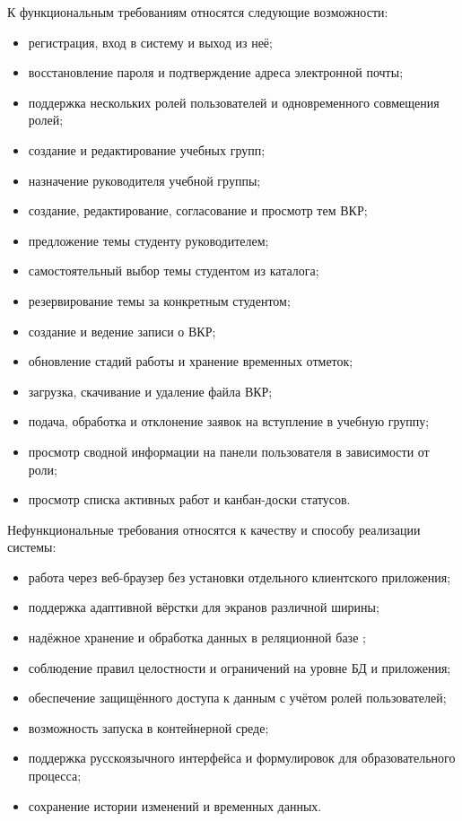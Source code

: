 \documentclass[14pt,a4paper]{extreport}
\begin{document}
К функциональным требованиям относятся следующие возможности:

\begin{itemize}
  \item регистрация, вход в систему и выход из неё;
  \item восстановление пароля и подтверждение адреса электронной почты;
  \item поддержка нескольких ролей пользователей и одновременного совмещения
        ролей;
  \item создание и редактирование учебных групп;
  \item назначение руководителя учебной группы;
  \item создание, редактирование, согласование и просмотр тем ВКР;
  \item предложение темы студенту руководителем;
  \item самостоятельный выбор темы студентом из каталога;
  \item резервирование темы за конкретным студентом;
  \item создание и ведение записи о ВКР;
  \item обновление стадий работы и хранение временных отметок;
  \item загрузка, скачивание и удаление файла ВКР;
  \item подача, обработка и отклонение заявок на вступление в учебную
        группу;
  \item просмотр сводной информации на панели пользователя в зависимости от
        роли;
  \item просмотр списка активных работ и канбан-доски статусов.
\end{itemize}

Нефункциональные требования относятся к качеству и способу реализации
системы:

\begin{itemize}
  \item работа через веб-браузер без установки отдельного клиентского
        приложения;
  \item поддержка адаптивной вёрстки для экранов различной ширины;
  \item надёжное хранение и обработка данных в реляционной базе
        \cite{date};
  \item соблюдение правил целостности и ограничений на уровне БД и
        приложения;
  \item обеспечение защищённого доступа к данным с учётом ролей
        пользователей;
  \item возможность запуска в контейнерной среде;
  \item поддержка русскоязычного интерфейса и формулировок для
        образовательного процесса;
  \item сохранение истории изменений и временных данных.
\end{itemize}
\end{document}
